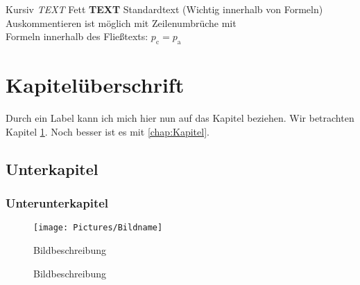 %
%


Kursiv \textit{TEXT}
Fett \textbf{TEXT}
Standardtext  (Wichtig innerhalb von Formeln)
Auskommentieren ist möglich mit %
Zeilenumbrüche mit \\
Formeln innerhalb des Fließtexts: $p_\text{c} = p_\text{a}$


\chapter{Kapitelüberschrift}
\label{chap:Kapitel}
Durch ein Label kann ich mich hier nun auf das Kapitel beziehen. Wir betrachten Kapitel \ref{chap:Kapitel}. Noch besser ist es mit \autoref{chap:Kapitel}.

\section{Unterkapitel}
\label{sec:unterkapitel}

\subsection{Unterunterkapitel}
\label{subsec:unterunterkapitel}





\begin{figure}[H]
{\centering
\texttt{[image: Pictures/Bildname]}
\caption{Bildbeschreibung}
\label{fig:Bild}
}
\end{figure}


\begin{figure}[H]
    \centering
    \hfill
    \hfill
    \caption{Bildbeschreibung}
    \label{fig:Bild3}
\end{figure}

